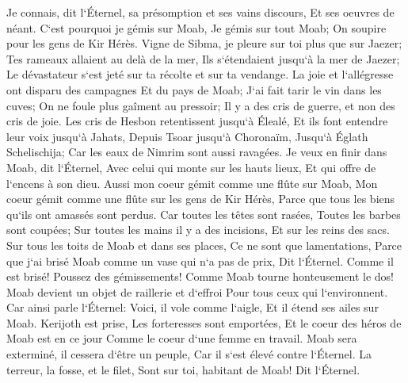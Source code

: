 \verse Je connais, dit l`Éternel, sa présomption et ses vains discours, Et ses oeuvres de néant. 
\verse C`est pourquoi je gémis sur Moab, Je gémis sur tout Moab; On soupire pour les gens de Kir Hérès. 
\verse Vigne de Sibma, je pleure sur toi plus que sur Jaezer; Tes rameaux allaient au delà de la mer, Ils s`étendaient jusqu`à la mer de Jaezer; Le dévastateur s`est jeté sur ta récolte et sur ta vendange. 
\verse La joie et l`allégresse ont disparu des campagnes Et du pays de Moab; J`ai fait tarir le vin dans les cuves; On ne foule plus gaîment au pressoir; Il y a des cris de guerre, et non des cris de joie. 
\verse Les cris de Hesbon retentissent jusqu`à Élealé, Et ils font entendre leur voix jusqu`à Jahats, Depuis Tsoar jusqu`à Choronaïm, Jusqu`à Églath Schelischija; Car les eaux de Nimrim sont aussi ravagées. 
\verse Je veux en finir dans Moab, dit l`Éternel, Avec celui qui monte sur les hauts lieux, Et qui offre de l`encens à son dieu. 
\verse Aussi mon coeur gémit comme une flûte sur Moab, Mon coeur gémit comme une flûte sur les gens de Kir Hérès, Parce que tous les biens qu`ils ont amassés sont perdus. 
\verse Car toutes les têtes sont rasées, Toutes les barbes sont coupées; Sur toutes les mains il y a des incisions, Et sur les reins des sacs. 
\verse Sur tous les toits de Moab et dans ses places, Ce ne sont que lamentations, Parce que j`ai brisé Moab comme un vase qui n`a pas de prix, Dit l`Éternel. 
\verse Comme il est brisé! Poussez des gémissements! Comme Moab tourne honteusement le dos! Moab devient un objet de raillerie et d`effroi Pour tous ceux qui l`environnent. 
\verse Car ainsi parle l`Éternel: Voici, il vole comme l`aigle, Et il étend ses ailes sur Moab. 
\verse Kerijoth est prise, Les forteresses sont emportées, Et le coeur des héros de Moab est en ce jour Comme le coeur d`une femme en travail. 
\verse Moab sera exterminé, il cessera d`être un peuple, Car il s`est élevé contre l`Éternel. 
\verse La terreur, la fosse, et le filet, Sont sur toi, habitant de Moab! Dit l`Éternel. 
